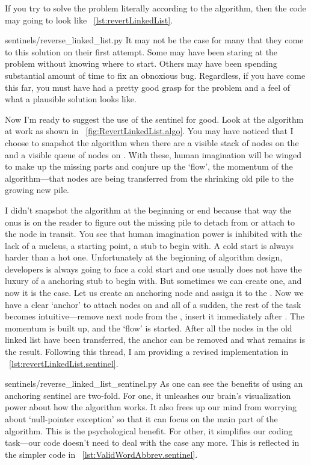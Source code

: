 If you try to solve the problem literally according to the algorithm,
then the code may going to look like ~\autoref{lst:revertLinkedList}.

{sentinels/reverse_linked_list.py}
It may not be the case for many that they come to this solution on their first attempt.
Some may have been staring at the problem without knowing where to start.
Others may have been spending substantial amount of time to fix an obnoxious bug.
Regardless, if you have come this far, you must have had a pretty good grasp for the problem
and a feel of what a plausible solution looks like.

Now I'm ready to suggest the use of the sentinel for good.
Look at the algorithm at work as shown in ~\autoref{fig:RevertLinkedList.algo}.
You may have noticed that I choose to snapshot the algorithm when there
are a visible stack of nodes on the  and a visible queue of
nodes on .
With these, human imagination will be winged to make up the missing parts and
conjure up the `flow', the momentum of the algorithm---that nodes
are being transferred from the shrinking old pile to the growing new pile.

I didn't snapshot the algorithm at the beginning or end because that way the onus is on the reader
to figure out the missing pile to detach from or attach to the node in transit.
You see that human imagination power is inhibited with the lack of a nucleus, a starting point,
a stub to begin with.
A cold start is always harder than a hot one.
Unfortunately at the beginning of algorithm design, developers is always going to face a cold start
and one usually does not have the luxury of a anchoring stub to begin with.
But sometimes we can create one, and now it is the case.
Let us create an anchoring node and assign it to the .
Now we have a clear `anchor' to attach nodes on and all of a sudden, the rest of the task becomes
intuitive---remove next node from the , insert it immediately after .
The momentum is built up, and the `flow' is started.
After all the nodes in the old linked list have been transferred, the anchor can be removed and
what remains is the result.
Following this thread, I am providing a revised implementation in
~\autoref{lst:revertLinkedList.sentinel}.

{sentinels/reverse_linked_list_sentinel.py}
As one can see the benefits of using an anchoring sentinel are two-fold.
For one, it unleashes our brain's visualization power about how the algorithm works.
It also frees up our mind from worrying about `null-pointer exception' so that it can focus on
the main part of the algorithm.
This is the psychological benefit.
For other, it simplifies our coding task---our code doesn't need to deal with the case
 any more.
This is reflected in the simpler code in ~\autoref{lst:ValidWordAbbrev.sentinel}.


